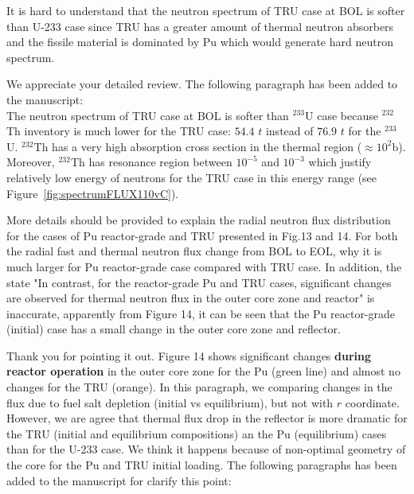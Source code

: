 \documentclass[answers,11pt]{exam}
\begin{document}
\begin{questions}
\begin{solution}
        \end{solution}

        \question It is hard to understand that the neutron spectrum of TRU case at BOL is softer than U-233 case since TRU has a greater amount of thermal neutron absorbers and the fissile material is dominated by Pu which would generate hard neutron spectrum.
        
        \begin{solution}
                 We appreciate your detailed review.                   
                 The following paragraph has been added to the manuscript:\\
                 
                 The neutron spectrum of TRU case at BOL is softer than $^{233}$U case because $^{232}$Th inventory is much lower for the TRU case: $54.4$ $t$ instead of $76.9$ $t$ for the $^{233}$U. $^{232}$Th has a very high absorption cross section in the thermal region ($\approx10^2 $b). Moreover, $^{232}$Th has resonance region between $10^{-5}$ and $10^{-3}$ which justify relatively low energy of neutrons for the TRU case in this energy range (see Figure~\ref{fig:spectrumFLUX110vC}). 
                 
        \end{solution}

        \question More details should be provided to explain the radial 
        neutron flux distribution for the cases of Pu reactor-grade and TRU 
        presented in Fig.13 and 14. For both the radial fast and thermal 
        neutron flux change from BOL to EOL, why it is much larger for Pu 
        reactor-grade case compared with TRU case. In addition, the state "In 
        contrast, for the reactor-grade Pu and TRU cases, significant changes 
        are observed for thermal neutron flux in the outer core zone and 
        reactor" is inaccurate, apparently from Figure 14, it can be seen that 
        the Pu reactor-grade (initial) case has a small change in the outer 
        core zone and reflector. 
        \begin{solution}
				Thank you for pointing it out. Figure 14 shows significant 
				changes \textbf{during reactor operation} in the outer core 
				zone for the Pu (green line) and almost no changes for the TRU 
				(orange). In this paragraph, we comparing changes in the flux 
				due to fuel salt depletion (initial vs equilibrium), but not 
				with $r$ coordinate. However, we are agree that thermal flux 
				drop in the reflector is more dramatic for the TRU (initial 
				and equilibrium compositions) an the Pu (equilibrium) cases 
				than for the U-233 case. We think it happens because of 
				non-optimal geometry of the core for the Pu and TRU initial 
				loading.			
				The following paragraphs has been added to the manuscript for 
				clarify this point:\\
				

\end{solution}
\end{questions}
\end{document}
